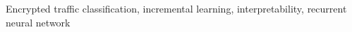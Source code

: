 \begin{IEEEkeywords}
Encrypted traffic classification,  incremental learning,  interpretability, recurrent neural network
\end{IEEEkeywords}